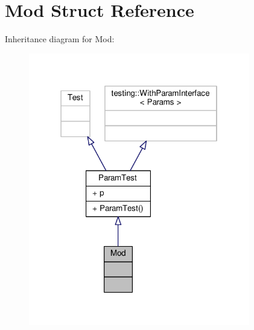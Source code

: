 \hypertarget{struct_mod}{}\section{Mod Struct Reference}
\label{struct_mod}


Inheritance diagram for Mod\+:
\nopagebreak
\begin{figure}[H]
\begin{center}
\leavevmode
\includegraphics[width=274pt]{struct_mod__inherit__graph}
\end{center}
\end{figure}


